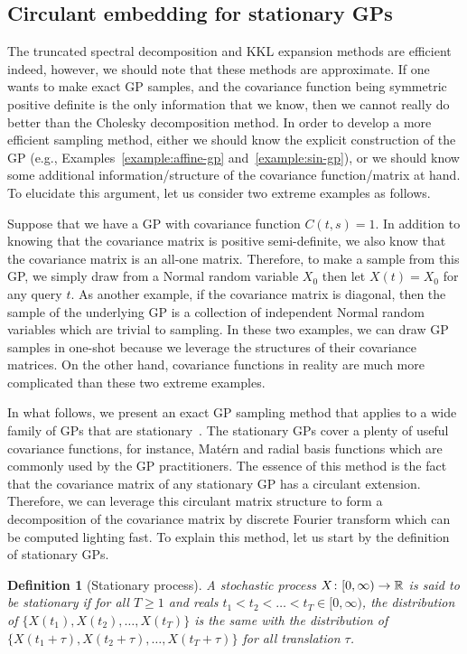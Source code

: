 \documentclass[]{article}
\newtheorem{definition}[theorem]{Definition}
\begin{document}
\subsection{Circulant embedding for stationary GPs}
\label{sec:circulant-embedding}
The truncated spectral decomposition and KKL expansion methods are efficient indeed, however, we should note that these methods are approximate. If one wants to make exact GP samples, and the covariance function being symmetric positive definite is the only information that we know, then we cannot really do better than the Cholesky decomposition method. In order to develop a more efficient sampling method, either we should know the explicit construction of the GP (e.g., Examples~\ref{example:affine-gp} and~\ref{example:sin-gp}), or we should know some additional information/structure of the covariance function/matrix at hand. To elucidate this argument, let us consider two extreme examples as follows. 

Suppose that we have a GP with covariance function $C(t,s) = 1$. In addition to knowing that the covariance matrix is positive semi-definite, we also know that the covariance matrix is an all-one matrix. Therefore, to make a sample from this GP, we simply draw from a Normal random variable $X_0$ then let $X(t) = X_0$ for any query $t$. As another example, if the covariance matrix is diagonal, then the sample of the underlying GP is a collection of independent Normal random variables which are trivial to sampling. In these two examples, we can draw GP samples in one-shot because we leverage the structures of their covariance matrices. On the other hand, covariance functions in reality are much more complicated than these two extreme examples.

In what follows, we present an exact GP sampling method that applies to a wide family of GPs that are stationary~\citep{Wood1994, Chan1997}. The stationary GPs cover a plenty of useful covariance functions, for instance, Mat\'{e}rn and radial basis functions which are commonly used by the GP practitioners. The essence of this method is the fact that the covariance matrix of any stationary GP has a circulant extension. Therefore, we can leverage this circulant matrix structure to form a decomposition of the covariance matrix by discrete Fourier transform which can be computed lighting fast. To explain this method, let us start by the definition of stationary GPs.

\begin{definition}[Stationary process]
	\label{def:stationary-gp}
	A stochastic process $X\colon [0, \infty) \to \mathbb{R}$ is said to be stationary if for all $T\geq 1$ and reals $t_1 < t_2 < \ldots < t_T \in [0, \infty)$, the distribution of $\lbrace X(t_1), X(t_2), \ldots, X(t_T) \rbrace$ is the same with the distribution of $\lbrace X(t_1 + \tau), X(t_2 + \tau), \ldots, X(t_T + \tau) \rbrace$ for all translation $\tau$.
\end{definition}
\end{document}
